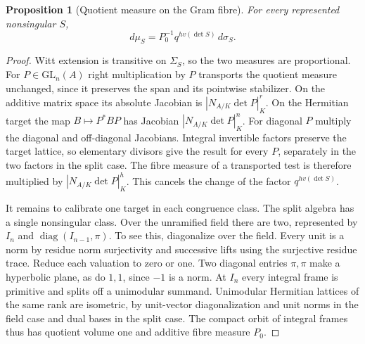 \documentclass[a4paper,11pt]{article}
\newtheorem{proposition}{Proposition}[section]
\theoremstyle{definition}
\theoremstyle{remark}
\numberwithin{equation}{section}
\begin{document}
\begin{proposition}[Quotient measure on the Gram fibre]\label{prop:quot215}
For every represented nonsingular \(S\),
\[
                 d\mu_S=P_0^{-1}q^{h v(\det S)}\,d\sigma_S .
\]
\end{proposition}
\begin{proof}
Witt extension is transitive on \(\Sigma_S\), so the two measures
are proportional. For \(P\in\mathrm{GL}_n(A)\) right
multiplication by \(P\) transports the quotient measure unchanged,
since it preserves the span and its pointwise stabilizer. On
the additive matrix space its absolute Jacobian is
\(|N_{A/K}\det P|_K^r\). On the Hermitian target the map
\(B\mapsto P^*BP\) has Jacobian \(|N_{A/K}\det P|_K^n\).
For diagonal \(P\) multiply the diagonal and off-diagonal
Jacobians. Integral invertible factors preserve the target
lattice, so elementary divisors give the result for every \(P\),
separately in the two factors in the split case. The fibre measure
of a transported test is therefore multiplied by
\(|N_{A/K}\det P|_K^h\). This cancels the change of the factor
\(q^{h v(\det S)}\).

It remains to calibrate one target in each congruence class.
The split algebra has a single nonsingular class. Over the
unramified field there are two, represented by \(I_n\) and
\(\operatorname{diag}(I_{n-1},\pi)\). To see this, diagonalize
over the field. Every unit is a norm by residue norm surjectivity
and successive lifts using the surjective residue trace. Reduce
each valuation to zero or one. Two diagonal entries \(\pi,\pi\)
make a hyperbolic plane, as do \(1,1\), since \(-1\) is a norm.
At \(I_n\) every integral frame is primitive and splits off a
unimodular summand. Unimodular Hermitian lattices of the same
rank are isometric, by unit-vector diagonalization and unit norms
in the field case and dual bases in the split case. The compact
orbit of integral frames thus has quotient volume one and
additive fibre measure \(P_0\).


\end{proof}
\end{document}
